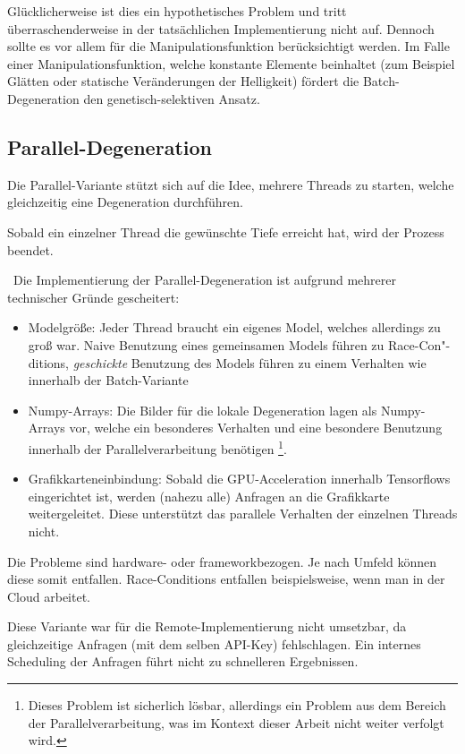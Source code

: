 Glücklicherweise ist dies ein hypothetisches Problem und tritt überraschenderweise in der tatsächlichen Implementierung nicht auf. 
Dennoch sollte es vor allem für die Manipulationsfunktion berücksichtigt werden. 
Im Falle einer Manipulationsfunktion, welche konstante Elemente beinhaltet (zum Beispiel Glätten oder statische Veränderungen der Helligkeit) fördert die Batch-Degeneration den genetisch-selektiven Ansatz.
\subsection{Parallel-Degeneration}
Die Parallel-Variante stützt sich auf die Idee, mehrere Threads zu starten, welche gleichzeitig eine Degeneration durchführen.

Sobald ein einzelner Thread die gewünschte Tiefe erreicht hat, wird der Prozess beendet. 

~\newline Die Implementierung der Parallel-Degeneration ist aufgrund mehrerer technischer Gründe gescheitert: 

\begin{itemize}
	\item Modelgröße: Jeder Thread braucht ein eigenes Model, welches allerdings zu groß war. 
	Naive Benutzung eines gemeinsamen Models führen zu Race-Con"-ditions, \textit{geschickte} Benutzung des Models führen zu einem Verhalten wie innerhalb der Batch-Variante
	\item Numpy-Arrays: Die Bilder für die lokale Degeneration lagen als Numpy-Arrays vor, welche ein besonderes Verhalten und eine besondere Benutzung innerhalb der Parallelverarbeitung benötigen \footnote{Dieses Problem ist sicherlich lösbar, allerdings ein Problem aus dem Bereich der Parallelverarbeitung, was im Kontext dieser Arbeit nicht weiter verfolgt wird.}. 
	\item Grafikkarteneinbindung: Sobald die GPU-Acceleration innerhalb Tensorflows eingerichtet ist, werden (nahezu alle) Anfragen an die Grafikkarte weitergeleitet. 
	Diese unterstützt das parallele Verhalten der einzelnen Threads nicht. 
\end{itemize} 

Die Probleme sind hardware- oder frameworkbezogen. 
Je nach Umfeld können diese somit entfallen. 
Race-Conditions entfallen beispielsweise, wenn man in der Cloud arbeitet.

Diese Variante war für die Remote-Implementierung nicht umsetzbar, da gleichzeitige Anfragen (mit dem selben API-Key) fehlschlagen. 
Ein internes Scheduling der Anfragen führt nicht zu schnelleren Ergebnissen. 
